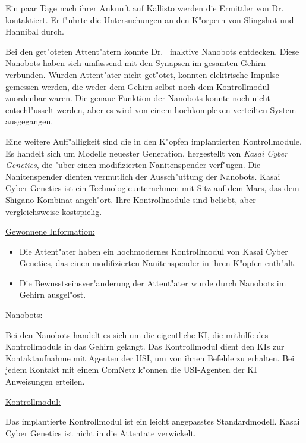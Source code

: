 
Ein paar Tage nach ihrer Ankunft auf Kallisto werden die Ermittler von Dr.~  kontaktiert. Er f"uhrte die Untersuchungen an den K"orpern von Slingshot und Hannibal durch.

Bei den get"oteten Attent"atern konnte Dr.~  inaktive Nanobots entdecken. Diese Nanobots haben sich umfassend mit den Synapsen im gesamten Gehirn verbunden. Wurden Attent"ater nicht get"otet, konnten elektrische Impulse gemessen werden, die weder dem Gehirn selbst noch dem Kontrollmodul zuordenbar waren. Die genaue Funktion der Nanobots konnte noch nicht entschl"usselt werden, aber es wird von einem hochkomplexen verteilten System ausgegangen.

Eine weitere Auff"alligkeit sind die in den K"opfen implantierten Kontrollmodule. Es handelt sich um Modelle neuester Generation, hergestellt von \emph{Kasai Cyber Genetics}, die "uber einen modifizierten Nanitenspender verf"ugen. Die Nanitenspender dienten vermutlich der Aussch"uttung der Nanobots. Kasai Cyber Genetics ist ein Technologieunternehmen mit Sitz auf dem Mars, das dem Shigano-Kombinat angeh"ort. Ihre Kontrollmodule sind beliebt, aber vergleichsweise kostspielig.

\begin{remarks}
	\underline{Gewonnene Information:}
	
	\begin{itemize}
		\item Die Attent"ater haben ein hochmodernes Kontrollmodul von Kasai Cyber Genetics, das einen modifizierten Nanitenspender in ihren 
			K"opfen enth"alt.
		\item Die Bewusstseinsver"anderung der Attent"ater wurde durch Nanobots im Gehirn ausgel"ost.
	\end{itemize}
	
	\underline{Nanobots:}

	Bei den Nanobots handelt es sich um die eigentliche KI, die mithilfe des Kontrollmoduls in das Gehirn gelangt. Das Kontrollmodul dient den KIs zur Kontaktaufnahme mit Agenten der USI, um von ihnen Befehle zu erhalten. Bei jedem Kontakt mit einem ComNetz k"onnen die USI-Agenten der KI Anweisungen erteilen.

	\underline{Kontrollmodul:}

	Das implantierte Kontrollmodul ist ein leicht angepasstes Standardmodell. Kasai Cyber Genetics ist nicht in die Attentate verwickelt.
\end{remarks}
\vfill
